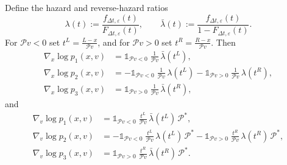 \documentclass[12pt,nopreprintline]{elsarticle}
\begin{document}
Define the hazard and reverse-hazard ratios
\[
\lambda(t):=\frac{f_{\Delta t,\varepsilon}(t)}{F_{\Delta t,\varepsilon}(t)},\qquad
\bar\lambda(t):=\frac{f_{\Delta t,\varepsilon}(t)}{1-F_{\Delta t,\varepsilon}(t)}.
\]
For $\mathcal P v<0$ set $t^L=\frac{L-x}{\mathcal P v}$, and for $\mathcal P v>0$ set $t^R=\frac{R-x}{\mathcal P v}$. Then
\begin{align*}
\nabla_x \log p_1(x,v) &= \mathds{1}_{\mathcal P v<0}\;\frac{1}{\mathcal P v}\,\bar\lambda(t^L),\\
\nabla_x \log p_2(x,v) &= -\mathds{1}_{\mathcal P v<0}\;\frac{1}{\mathcal P v}\,\lambda(t^L) -\mathds{1}_{\mathcal P v>0}\;\frac{1}{\mathcal P v}\,\lambda(t^R),\\
\nabla_x \log p_3(x,v) &= \mathds{1}_{\mathcal P v>0}\;\frac{1}{\mathcal P v}\,\bar\lambda(t^R),
\end{align*}
and
\begin{align*}
\nabla_v \log p_1(x,v) &= \mathds{1}_{\mathcal P v<0}\;\frac{t^L}{\mathcal P v}\,\bar\lambda(t^L)\,\mathcal P^*,\\
\nabla_v \log p_2(x,v) &= -\mathds{1}_{\mathcal P v<0}\;\frac{t^L}{\mathcal P v}\,\lambda(t^L)\,\mathcal P^* -\mathds{1}_{\mathcal P v>0}\;\frac{t^R}{\mathcal P v}\,\lambda(t^R)\,\mathcal P^*,\\
\nabla_v \log p_3(x,v) &= \mathds{1}_{\mathcal P v>0}\;\frac{t^R}{\mathcal P v}\,\bar\lambda(t^R)\,\mathcal P^* .
\end{align*}
\end{document}
